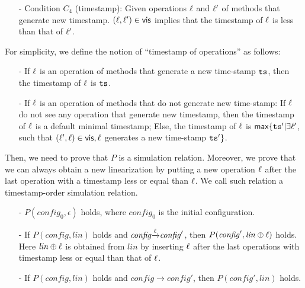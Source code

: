 \begin{itemize}
\setlength{\itemsep}{0.5pt}
\item[-] Condition $C_4$ (timestamp): Given operations $\ell$ and $\ell'$ of methods that generate new timestamp. $(\ell,\ell') \in \mathsf{vis}$ implies that the timestamp of $\ell$ is less than that of $\ell'$. 
\end{itemize} 

For simplicity, we define the notion of ``timestamp of operations'' as follows: 

\begin{itemize}
\setlength{\itemsep}{0.5pt}
\item[-] If $\ell$ is an operation of methods that generate a new time-stamp $\mathtt{ts}$, then the timestamp of $\ell$ is $\mathtt{ts}$. 

\item[-] If $\ell$ is an operation of methods that do not generate new time-stamp: If $\ell$ do not see any operation that generate new timestamp, then the timestamp of $\ell$ is a default minimal timestamp; Else, the timestamp of $\ell$ is $\mathsf{max} \{ \mathtt{ts}' \vert \exists \ell'$, such that $(\ell',\ell) \in \mathsf{vis}, \ell$ generates a new time-stamp $\mathtt{ts}' \}$. 
\end{itemize} 

Then, we need to prove that $P$ is a simulation relation. Moreover, we prove that we can always obtain a new linearization by putting a new operation $\ell$ after the last operation with a timestamp less or equal than $\ell$. We call such relation a timestamp-order simulation relation. 

\begin{itemize}
\setlength{\itemsep}{0.5pt}
\item[-] $P(\mathit{config}_0,\epsilon)$ holds, where $\mathit{config}_0$ is the initial configuration.

\item[-] If $P(\mathit{config},\mathit{lin})$ holds and $\mathit{config} {\xrightarrow{\ell}} \mathit{config}'$, then $P(\mathit{config}', \mathit{lin} \oplus \ell)$ holds. Here  $\mathit{lin} \oplus \ell$ is obtained from $\mathit{lin}$ by inserting $\ell$ after the last operations with timestamp less or equal than that of $\ell$. 

\item[-] If $P(\mathit{config},\mathit{lin})$ holds and $\mathit{config} {\xrightarrow{}} \mathit{config}'$, then $P(\mathit{config}',\mathit{lin})$ holds.
\end{itemize}

